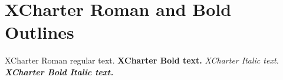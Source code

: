 \documentclass{article}
\begin{document}
\section{XCharter Roman and Bold Outlines}

XCharter Roman regular text.
\textbf{XCharter Bold text.}
\textit{XCharter Italic text.}
\textbf{\textit{XCharter Bold Italic text.}}
\end{document}
